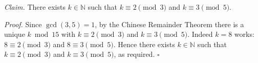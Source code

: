 \textit{Claim.} There exists $k \in \mathbb{N}$ such that $k \equiv 2 \pmod{3}$ and $k \equiv 3 \pmod{5}$.

\textit{Proof.} Since $\gcd(3, 5) = 1$, by the Chinese Remainder Theorem there is a unique $k \bmod 15$ with $k \equiv 2 \pmod{3}$ and $k \equiv 3 \pmod{5}$.
Indeed $k = 8$ works: $8 \equiv 2 \pmod{3}$ and $8 \equiv 3 \pmod{5}$.
Hence there exists $k \in \mathbb{N}$ such that $k \equiv 2 \pmod{3}$ and $k \equiv 3 \pmod{5}$, as required. \hfill$\square$